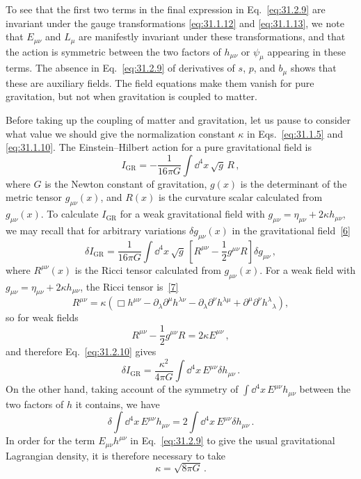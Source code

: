 To see that the first two terms in the final expression in
Eq.~\eqref{eq:31.2.9} are invariant under the gauge transformations
\eqref{eq:31.1.12} and \eqref{eq:31.1.13}, we note that \(E_{\mu\nu}\) and
\(L_\mu\) are manifestly invariant under these transformations, and that the
action is symmetric between the two factors of \(h_{\mu\nu}\) or \(\psi_\mu\)
appearing in these terms. The absence in Eq.~\eqref{eq:31.2.9} of derivatives
of \(s\), \(p\), and \(b_\mu\) shows that these are auxiliary fields. The field
equations make them vanish for pure gravitation, but not when gravitation is
coupled to matter.

Before taking up the coupling of matter and gravitation, let us pause to
consider what value we should give the normalization constant \(\kappa\) in
Eqs.~\eqref{eq:31.1.5} and \eqref{eq:31.1.10}. The Einstein--Hilbert action
for a pure gravitational field is
\begin{equation}
  I_{\mathrm{GR}}
  =-\frac{1}{16\pi G}\int \dd^4x\,\sqrt{g}\,R\,,
  \tag{31.2.10}\label{eq:31.2.10}
\end{equation}
where \(G\) is the Newton constant of gravitation, \(g(x)\) is the determinant
of the metric tensor \(g_{\mu\nu}(x)\), and \(R(x)\) is the curvature scalar
calculated from \(g_{\mu\nu}(x)\). To calculate \(I_{\mathrm{GR}}\) for a weak
gravitational field with
\(g_{\mu\nu}=\eta_{\mu\nu}+2\kappa h_{\mu\nu}\), we may recall that for
arbitrary variations \(\delta g_{\mu\nu}(x)\) in the gravitational
field~\hyperref[ch31-ref-6]{[6]}
\begin{equation}
  \delta I_{\mathrm{GR}}
  =\frac{1}{16\pi G}\int \dd^4x\,\sqrt{g}\,
   \left[R^{\mu\nu}-\frac12g^{\mu\nu}R\right]\delta g_{\mu\nu}\,,
  \tag{31.2.11}\label{eq:31.2.11}
\end{equation}
where \(R^{\mu\nu}(x)\) is the Ricci tensor calculated from
\(g_{\mu\nu}(x)\). For a weak field with
\(g_{\mu\nu}=\eta_{\mu\nu}+2\kappa h_{\mu\nu}\), the Ricci tensor
is~\hyperref[ch31-ref-7]{[7]}
\begin{equation}
  R^{\mu\nu}
  =\kappa\left(
     \Box h^{\mu\nu}
     -\partial_\lambda\partial^\mu h^{\lambda\nu}
     -\partial_\lambda\partial^\nu h^{\lambda\mu}
     +\partial^\mu\partial^\nu h^\lambda{}_\lambda
   \right),
  \tag{31.2.12}\label{eq:31.2.12}
\end{equation}
so for weak fields
\begin{equation}
  R^{\mu\nu}-\frac12g^{\mu\nu}R=2\kappa E^{\mu\nu}\,,
  \tag{31.2.13}\label{eq:31.2.13}
\end{equation}
and therefore Eq.~\eqref{eq:31.2.10} gives
\[
  \delta I_{\mathrm{GR}}
  =\frac{\kappa^2}{4\pi G}
   \int \dd^4x\,E^{\mu\nu}\delta h_{\mu\nu}\,.
\]
On the other hand, taking account of the symmetry of
\(\int \dd^4x\,E^{\mu\nu}h_{\mu\nu}\) between the two factors of \(h\) it
contains, we have
\[
  \delta\int \dd^4x\,E^{\mu\nu}h_{\mu\nu}
  =2\int \dd^4x\,E^{\mu\nu}\delta h_{\mu\nu}\,.
\]
In order for the term \(E_{\mu\nu}h^{\mu\nu}\) in
Eq.~\eqref{eq:31.2.9} to give the usual gravitational Lagrangian density, it
is therefore necessary to take
\begin{equation}
  \kappa=\sqrt{8\pi G}\,.
  \tag{31.2.14}\label{eq:31.2.14}
\end{equation}

